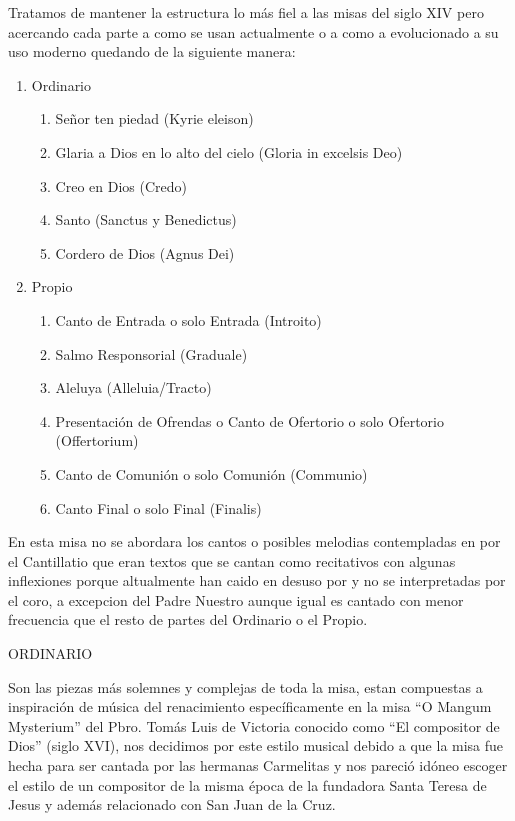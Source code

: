 \documentclass[12pt, letterpaper]{report}
\begin{document}
    Tratamos de mantener la estructura lo m\'as fiel a las misas del siglo XIV pero acercando cada parte a como se usan
    actualmente o a como a evolucionado a su uso moderno quedando de la siguiente manera:

    \renewcommand{\theenumi}{\arabic{enumi}}
    \begin{enumerate}
        \item Ordinario
        \begin{enumerate}
            \item Se\~nor ten piedad (Kyrie eleison)
            \item Glaria a Dios en lo alto del cielo (Gloria in excelsis Deo)
            \item Creo en Dios (Credo)
            \item Santo (Sanctus y Benedictus)
            \item Cordero de Dios (Agnus Dei)
        \end{enumerate}

        \item Propio
        \begin{enumerate}
            \item Canto de Entrada o solo Entrada (Introito)
            \item Salmo Responsorial (Graduale)
            \item Aleluya (Alleluia/Tracto)
            \item Presentaci\'on de Ofrendas o Canto de Ofertorio o solo Ofertorio (Offertorium)
            \item Canto de Comuni\'on o solo Comuni\'on (Communio)
            \item Canto Final o solo Final (Finalis)
        \end{enumerate}
    \end{enumerate}

    En esta misa no se abordara los cantos o posibles melodias contempladas en por el Cantillatio que eran textos que se
    cantan como recitativos con algunas inflexiones porque altualmente han caido en desuso por y no se interpretadas por el coro,
    a excepcion del Padre Nuestro aunque igual es cantado con menor frecuencia que el resto de partes del Ordinario o el Propio.

    \LARGE ORDINARIO

    \Large Son las piezas m\'as solemnes y complejas de toda la misa, estan compuestas a inspiraci\'on de m\'usica del renacimiento espec\'ificamente
    en la misa ``O Mangum Mysterium'' del Pbro. Tom\'as Luis de Victoria conocido como ``El compositor de Dios'' (siglo XVI),
    nos decidimos por este estilo musical debido a que la misa fue hecha para ser cantada por las hermanas Carmelitas y nos
    pareci\'o id\'oneo escoger el estilo de un compositor de la misma \'epoca de la fundadora Santa Teresa de Jesus y adem\'as
    relacionado con San Juan de la Cruz.
\end{document}
